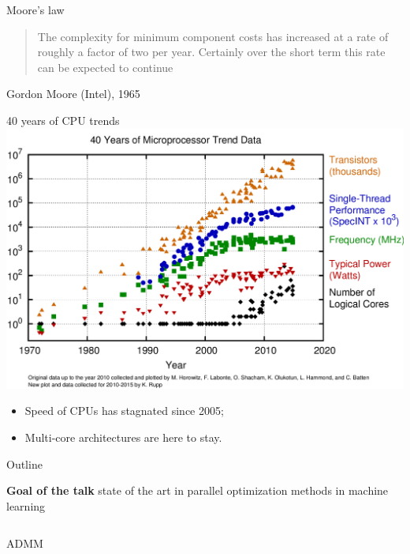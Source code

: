 \documentclass[10pt]{beamer}
\begin{document}
\begin{frame}{Moore's law}
\begin{quote}
The complexity for minimum component costs 
has increased at a rate of roughly a factor of 
two per year. Certainly over the short term this 
rate can be expected to continue
\end{quote}
Gordon Moore (Intel), 1965
\end{frame}


\begin{frame}{40 years of CPU trends}
\centering\includegraphics[width=0.8\linewidth]{img/moore_law}

\begin{itemize}[<+->]
\item Speed of CPUs has stagnated since 2005;
\item Multi-core architectures are here to stay.
\end{itemize}
\end{frame}


\begin{frame}{Outline}

{\bfseries Goal of the talk} state of the art in parallel optimization methods in machine learning

\begin{columns}[T] %
\begin{column}{.5\textwidth}
ADMM
\end{column}%
\hfill%
\begin{column}{.5\textwidth}

\end{column}%
\end{columns}

\end{frame}
\end{document}
